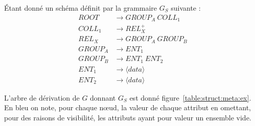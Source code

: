 \begin{example}
    Étant donné un schéma définit par la grammaire $G_S$ suivante :
    \begin{align*}
        ROOT    & \to GROUP_A ~ COLL_1     \\
        COLL_1  & \to REL_X^+              \\
        REL_X   & \to GROUP_A ~ GROUP_B    \\
        GROUP_A & \to ENT_1                \\
        GROUP_B & \to ENT_1 ~ ENT_2        \\
        ENT_1   & \to \langle data \rangle \\
        ENT_2   & \to \langle data \rangle
    \end{align*}

    L'arbre de dérivation de $G$ donnant $G_S$ est donné figure~\ref{table:struct:meta:ex}.
    En bleu on note, pour chaque nœud, la valeur de chaque attribut en omettant, pour des raisons de visibilité, les attributs ayant pour valeur un ensemble vide.
\end{example}

